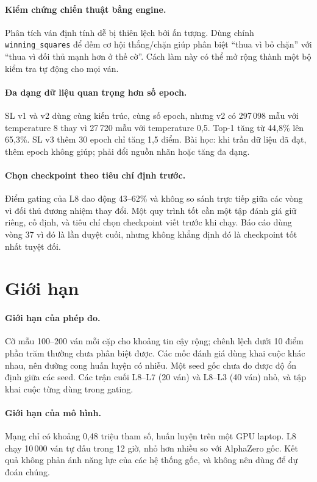 \paragraph{Kiểm chứng chiến thuật bằng engine.} Phân tích ván định tính dễ bị thiên lệch bởi
ấn tượng. Dùng chính \texttt{winning\_squares} để đếm cơ hội thắng/chặn giúp phân biệt ``thua vì bỏ
chặn'' với ``thua vì đối thủ mạnh hơn ở thế cờ''. Cách làm này có thể mở rộng thành một bộ
kiểm tra tự động cho mọi ván.

\paragraph{Đa dạng dữ liệu quan trọng hơn số epoch.} SL v1 và v2 dùng cùng kiến trúc, cùng số
epoch, nhưng v2 có 297\,098 mẫu với temperature 8 thay vì 27\,720 mẫu với temperature 0,5. Top-1
tăng từ 44,8\% lên 65,3\%. SL v3 thêm 30 epoch chỉ tăng 1,5 điểm. Bài học: khi trần dữ liệu
đã đạt, thêm epoch không giúp; phải đổi nguồn nhãn hoặc tăng đa dạng.

\paragraph{Chọn checkpoint theo tiêu chí định trước.} Điểm gating của L8 dao động 43--62\% và
không so sánh trực tiếp giữa các vòng vì đối thủ đương nhiệm thay đổi. Một quy trình tốt cần
một tập đánh giá giữ riêng, cố định, và tiêu chí chọn checkpoint viết trước khi chạy. Báo cáo
dùng vòng 37 vì đó là lần duyệt cuối, nhưng không khẳng định đó là checkpoint tốt nhất tuyệt
đối.

\section{Giới hạn}
\label{sec:kl-gioi-han}
\paragraph{Giới hạn của phép đo.} Cỡ mẫu 100--200 ván mỗi cặp cho khoảng tin cậy rộng; chênh
lệch dưới 10 điểm phần trăm thường chưa phân biệt được. Các mốc đánh giá dùng khai cuộc khác
nhau, nên đường cong huấn luyện có nhiễu. Một seed gốc chưa đo được độ ổn định giữa các seed.
Các trận cuối L8--L7 (20 ván) và L8--L3 (40 ván) nhỏ, và tập khai cuộc từng dùng trong gating.

\paragraph{Giới hạn của mô hình.} Mạng chỉ có khoảng 0,48 triệu tham số, huấn luyện trên một
GPU laptop. L8 chạy 10\,000 ván tự đấu trong 12 giờ, nhỏ hơn nhiều so với AlphaZero gốc. Kết
quả không phản ánh năng lực của các hệ thống gốc, và không nên dùng để dự đoán chúng.

